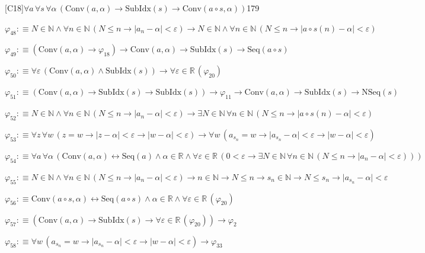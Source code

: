\begin{fullproof}{[C18]}{$\forall a\,\forall s\,\forall \alpha\,(\mathrm{Conv}(a,\alpha) \to \mathrm{SubIdx}(s) \to \mathrm{Conv}(a \circ s,\alpha))$}{179}
\begin{abbrevlist}
\item $\varphi_{48} :\equiv N \in \mathbb{N} \land \forall n \in \mathbb{N}\,(N \leq n \to \lvert a_{n} - \alpha \rvert < \varepsilon) \to N \in \mathbb{N} \land \forall n \in \mathbb{N}\,(N \leq n \to \lvert a \circ s(n) - \alpha \rvert < \varepsilon)$
\item $\varphi_{49} :\equiv (\mathrm{Conv}(a,\alpha) \to \varphi_{18}) \to \mathrm{Conv}(a,\alpha) \to \mathrm{SubIdx}(s) \to \mathrm{Seq}(a \circ s)$
\item $\varphi_{50} :\equiv \forall \varepsilon\,(\mathrm{Conv}(a,\alpha) \land \mathrm{SubIdx}(s)) \to \forall \varepsilon \in \mathbb{R}\,(\varphi_{20})$
\item $\varphi_{51} :\equiv (\mathrm{Conv}(a,\alpha) \to \mathrm{SubIdx}(s) \to \mathrm{SubIdx}(s)) \to \varphi_{11} \to \mathrm{Conv}(a,\alpha) \to \mathrm{SubIdx}(s) \to \mathrm{NSeq}(s)$
\item $\varphi_{52} :\equiv N \in \mathbb{N} \land \forall n \in \mathbb{N}\,(N \leq n \to \lvert a_{n} - \alpha \rvert < \varepsilon) \to \exists N \in \mathbb{N}\,\forall n \in \mathbb{N}\,(N \leq n \to \lvert a \circ s(n) - \alpha \rvert < \varepsilon)$
\item $\varphi_{53} :\equiv \forall z\,\forall w\,(z = w \to \lvert z - \alpha \rvert < \varepsilon \to \lvert w - \alpha \rvert < \varepsilon) \to \forall w\,(a_{s_{n}} = w \to \lvert a_{s_{n}} - \alpha \rvert < \varepsilon \to \lvert w - \alpha \rvert < \varepsilon)$
\item $\varphi_{54} :\equiv \forall a\,\forall \alpha\,(\mathrm{Conv}(a,\alpha) \leftrightarrow \mathrm{Seq}(a) \land \alpha \in \mathbb{R} \land \forall \varepsilon \in \mathbb{R}\,(0 < \varepsilon \to \exists N \in \mathbb{N}\,\forall n \in \mathbb{N}\,(N \leq n \to \lvert a_{n} - \alpha \rvert < \varepsilon)))$
\item $\varphi_{55} :\equiv N \in \mathbb{N} \land \forall n \in \mathbb{N}\,(N \leq n \to \lvert a_{n} - \alpha \rvert < \varepsilon) \to n \in \mathbb{N} \to N \leq n \to s_{n} \in \mathbb{N} \to N \leq s_{n} \to \lvert a_{s_{n}} - \alpha \rvert < \varepsilon$
\item $\varphi_{56} :\equiv \mathrm{Conv}(a \circ s,\alpha) \leftrightarrow \mathrm{Seq}(a \circ s) \land \alpha \in \mathbb{R} \land \forall \varepsilon \in \mathbb{R}\,(\varphi_{20})$
\item $\varphi_{57} :\equiv (\mathrm{Conv}(a,\alpha) \to \mathrm{SubIdx}(s) \to \forall \varepsilon \in \mathbb{R}\,(\varphi_{20})) \to \varphi_{2}$
\item $\varphi_{58} :\equiv \forall w\,(a_{s_{n}} = w \to \lvert a_{s_{n}} - \alpha \rvert < \varepsilon \to \lvert w - \alpha \rvert < \varepsilon) \to \varphi_{33}$

\end{abbrevlist}
\end{fullproof}
